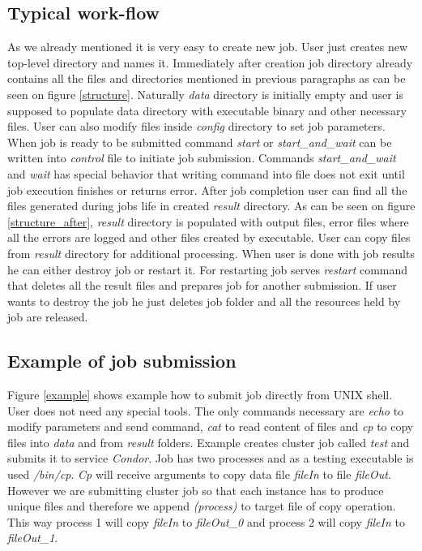 \documentclass[a4paper,10pt,twocolumn]{article}
\newcommand{\code}[1]{\textit{#1}}
\begin{document}
\subsection{Typical work-flow}
As we already mentioned it is very easy to create new job. User just creates new top-level directory and names it. Immediately after creation job directory already contains all the files and directories mentioned in previous paragraphs as can be seen on figure \ref{structure}. Naturally \code{data} directory is initially empty and user is supposed to populate data directory with executable binary and other necessary files. User can also modify files inside \code{config} directory to set job parameters. When job is ready to be submitted command \code{start} or \code{start\_and\_wait} can be written into \code{control} file to initiate job submission. Commands \code{start\_and\_wait} and \code{wait} has special behavior that writing command into file does not exit until job execution finishes or returns error. After job completion user can find all the files generated during jobs life in created \code{result} directory. As can be seen on figure \ref{structure_after}, \code{result} directory is populated with output files, error files where all the errors are logged and other files created by executable. User can copy files from \code{result} directory for additional processing. When user is done with job results he can either destroy job or restart it. For restarting job serves \code{restart} command that deletes all the result files and prepares job for another submission. If user wants to destroy the job he just deletes job folder and all the resources held by job are released.

\subsection{Example of job submission}

Figure \ref{example} shows example how to submit job directly from UNIX shell. User does not need any special tools. The only commands necessary are \code{echo} to modify parameters and send command, \code{cat} to read content of files and \code{cp} to copy files into \code{data} and from \code{result} folders.
Example creates cluster job called \code{test} and submits it to  service \code{Condor}. Job has two processes and as a testing executable is used \code{/bin/cp}. \code{Cp} will receive arguments to copy data file \code{fileIn} to file \code{fileOut}. However we are submitting cluster job so that each instance has to produce unique files and therefore we append \code{\textdollar(process)} to target file of copy operation. This way process 1 will copy \code{fileIn} to \code{fileOut\_0} and process 2 will copy \code{fileIn} to \code{fileOut\_1}.
\end{document}
